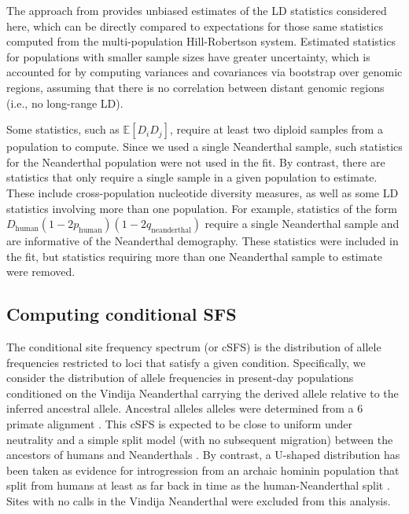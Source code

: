 \documentclass[]{article}
\newcommand{\E}{\mathbb{E}}
\begin{document}
The approach from \citet{Ragsdale2020-nz} provides unbiased estimates of the LD
statistics considered here, which can be directly compared to expectations for
those same statistics computed from the multi-population Hill-Robertson system.
Estimated statistics for populations with smaller sample sizes have greater
uncertainty, which is accounted for by computing variances and covariances via
bootstrap over genomic regions, assuming that there is no correlation between
distant genomic regions (i.e., no long-range LD).

Some statistics, such as $\E[D_i D_j]$, require at least two diploid samples
from a population to compute. Since we used a single Neanderthal sample, such
statistics for the Neanderthal population were not used in the fit. By contrast,
there are statistics that only require a single sample in a given population to
estimate. These include cross-population nucleotide diversity measures, as well
as some LD statistics involving more than one population. For example,
statistics of the form
$D_{\text{human}}(1-2p_{\text{human}})(1-2q_{\text{neanderthal}})$ require a
single Neanderthal sample and are informative of the Neanderthal demography.
These statistics were included in the fit, but statistics requiring more than
one Neanderthal sample to estimate were removed.

\subsection{Computing conditional SFS}\label{sec:computing-csfs}

The conditional site frequency spectrum (or cSFS) is the distribution of allele
frequencies restricted to loci that satisfy a given condition. Specifically, we
consider the distribution of allele frequencies in present-day populations
conditioned on the Vindija Neanderthal carrying the derived allele relative to
the inferred ancestral allele. Ancestral alleles alleles were determined from a
6 primate alignment \citep{1000_Genomes_Project_Consortium2015-zq}.
This cSFS is expected to be close to
uniform under neutrality and a simple split model (with no subsequent
migration) between the ancestors of humans and Neanderthals
\citep{Chen2007-iy}. By contrast, a U-shaped distribution has been taken as
evidence for introgression from an archaic hominin population that split
from humans at least as far back in time as the human-Neanderthal split
\citep{Yang2012-ze,Durvasula2020-td}.
Sites with no calls in the Vindija Neanderthal were excluded from
this analysis.
\end{document}
